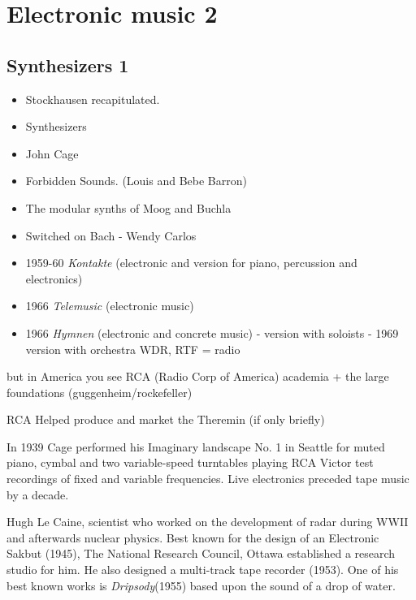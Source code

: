 
\chapter{Electronic music 2}
\label{history2}

\section{Synthesizers 1}
\begin{itemize}
\item Stockhausen recapitulated.
\item Synthesizers
\item John Cage
\item Forbidden Sounds. (Louis and Bebe Barron)
\item The modular synths of Moog and Buchla
\item Switched on Bach - Wendy Carlos
\end{itemize}

\begin{itemize}
\item 1959-60 \textit{Kontakte} (electronic and version for piano, percussion and electronics)
\item 1966 \textit{Telemusic} (electronic music)
\item 1966 \textit{Hymnen} (electronic and concrete music) - version with soloists - 1969 version with orchestra
WDR, RTF = radio
\end{itemize}

but in America you see RCA (Radio Corp of America) academia + the large foundations (guggenheim/rockefeller)

RCA Helped produce and market the Theremin (if only briefly)

In 1939 Cage performed his Imaginary landscape No. 1 in Seattle for muted piano, cymbal and two variable-speed turntables playing RCA Victor test recordings of fixed and variable frequencies. Live electronics preceded tape music by a decade.

Hugh Le Caine, scientist who worked on the development of radar during WWII and afterwards nuclear physics. Best known for the design of an Electronic Sakbut (1945), The National Research Council, Ottawa established a research studio for him. He also designed a multi-track tape recorder (1953). One of his best known works is \textit{Dripsody}(1955) based upon the sound of a drop of water.

